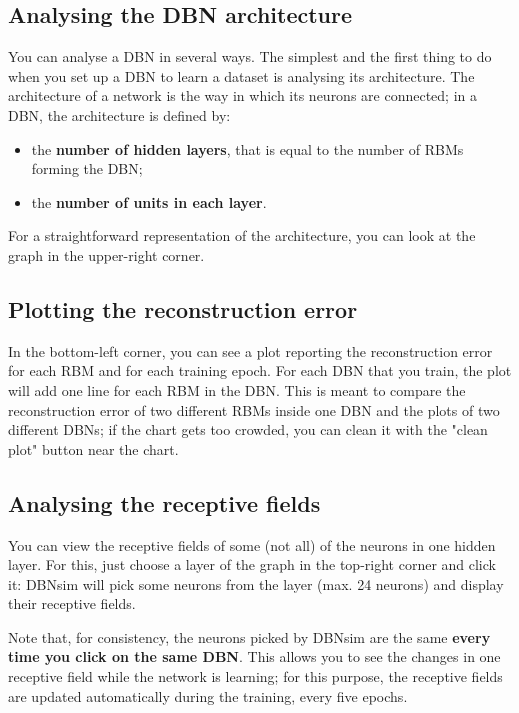 \documentclass[a4paper]{article}
\begin{document}
		
	\subsection{Analysing the DBN architecture}

		
You can analyse a DBN in several ways. The simplest and the first thing to do when you set up a DBN to learn a dataset is analysing its architecture. The architecture of a network is the way in which its neurons are connected; in a DBN, the architecture is defined by:
		
	\begin{itemize}
		
			
	\item the \textbf{number of hidden layers}, that is equal to the number of RBMs forming the DBN;
			
	\item the \textbf{number of units in each layer}.
		
	\end{itemize}

		
For a straightforward representation of the architecture, you can look at the graph in the upper-right corner.

		
	\subsection{Plotting the reconstruction error}

		
In the bottom-left corner, you can see a plot reporting the reconstruction error for each RBM and for each training epoch. For each DBN that you train, the plot will add one line for each RBM in the DBN. This is meant to compare the reconstruction error of two different RBMs inside one DBN and the plots of two different DBNs; if the chart gets too crowded, you can clean it with the "clean plot" button near the chart.

		
	\subsection{Analysing the receptive fields}

		
You can view the receptive fields of some (not all) of the neurons in one hidden layer. For this, just choose a layer of the graph in the top-right corner and click it: DBNsim will pick some neurons from the layer (max. 24 neurons) and display their receptive fields.
		
Note that, for consistency, the neurons picked by DBNsim are the same \textbf{every time you click on the same DBN}. This allows you to see the changes in one receptive field while the network is learning; for this purpose, the receptive fields are updated automatically during the training, every five epochs.
\end{document}
